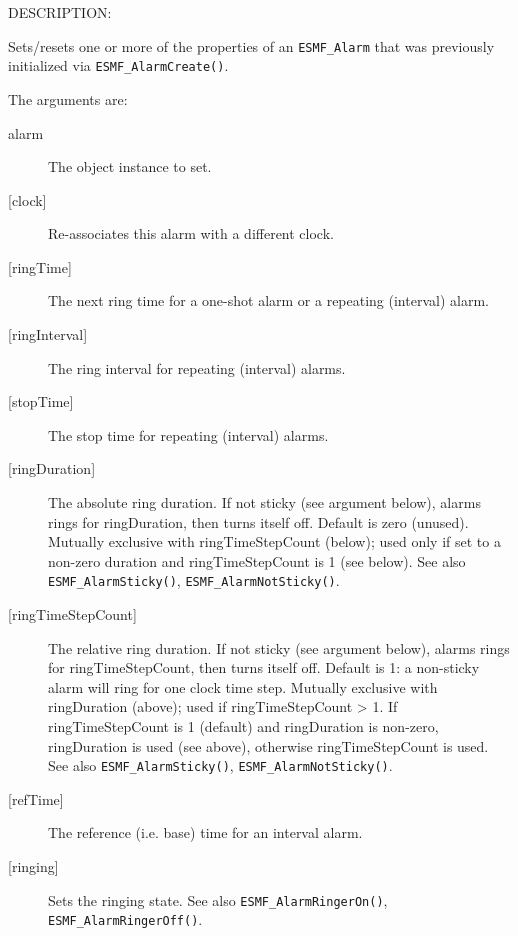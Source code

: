 {\sf DESCRIPTION:\\ }


       \begin{sloppypar}
       Sets/resets one or more of the properties of an {\tt ESMF\_Alarm} that
       was previously initialized via {\tt ESMF\_AlarmCreate()}.
       \end{sloppypar}
  
       The arguments are:
       \begin{description}
       \item[alarm]
            The object instance to set.
       \item[{[clock]}]
            Re-associates this alarm with a different clock.
       \item[{[ringTime]}]
            The next ring time for a one-shot alarm or a repeating (interval)
            alarm.
       \item[{[ringInterval]}]
            The ring interval for repeating (interval) alarms.
       \item[{[stopTime]}]
            The stop time for repeating (interval) alarms.
       \item[{[ringDuration]}]
            The absolute ring duration.  If not sticky (see argument below),
            alarms rings for ringDuration, then turns itself off.  Default is
            zero (unused).  Mutually exclusive with ringTimeStepCount (below);
            used only if set to a non-zero duration and ringTimeStepCount is 1
            (see below).
            See also {\tt ESMF\_AlarmSticky()}, {\tt ESMF\_AlarmNotSticky()}.
       \item[{[ringTimeStepCount]}]
            The relative ring duration.  If not sticky (see argument below),
            alarms rings for ringTimeStepCount, then turns itself off.
            Default is 1: a non-sticky alarm will ring for one clock time step.
            Mutually exclusive with ringDuration (above); used if
            ringTimeStepCount > 1.  If ringTimeStepCount is 1 (default) and
            ringDuration is non-zero, ringDuration is used (see above), otherwise
            ringTimeStepCount is used.
            See also {\tt ESMF\_AlarmSticky()}, {\tt ESMF\_AlarmNotSticky()}.
       \item[{[refTime]}]
            The reference (i.e. base) time for an interval alarm.
       \item[{[ringing]}]
            Sets the ringing state.
            See also {\tt ESMF\_AlarmRingerOn()}, {\tt ESMF\_AlarmRingerOff()}.

\end{description}
